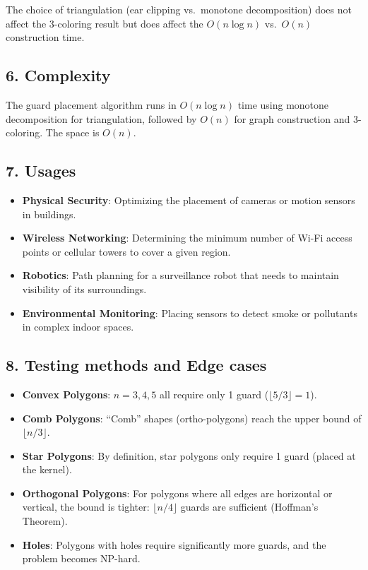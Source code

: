 \begin{definition}
\label{def:ag_triangulation_choice}
The choice of triangulation (ear clipping vs.\ monotone decomposition) does not affect the 3-coloring result but does affect the $O(n \log n)$ vs.\ $O(n)$ construction time.
\end{definition}

\subsection{6. Complexity}
\begin{theorem}
\label{thm:ag_complexity}
The guard placement algorithm runs in $O(n \log n)$ time using monotone decomposition for triangulation, followed by $O(n)$ for graph construction and 3-coloring. The space is $O(n)$.
\end{theorem}

\subsection{7. Usages}
\begin{itemize}
    \item \textbf{Physical Security}: Optimizing the placement of cameras or motion sensors in buildings.
    \item \textbf{Wireless Networking}: Determining the minimum number of Wi-Fi access points or cellular towers to cover a given region.
    \item \textbf{Robotics}: Path planning for a surveillance robot that needs to maintain visibility of its surroundings.
    \item \textbf{Environmental Monitoring}: Placing sensors to detect smoke or pollutants in complex indoor spaces.
\end{itemize}

\subsection{8. Testing methods and Edge cases}
\begin{itemize}
    \item \textbf{Convex Polygons}: $n=3, 4, 5$ all require only 1 guard ($\lfloor 5/3 \rfloor = 1$).
    \item \textbf{Comb Polygons}: ``Comb'' shapes (ortho-polygons) reach the upper bound of $\lfloor n/3 \rfloor$.
    \item \textbf{Star Polygons}: By definition, star polygons only require 1 guard (placed at the kernel).
    \item \textbf{Orthogonal Polygons}: For polygons where all edges are horizontal or vertical, the bound is tighter: $\lfloor n/4 \rfloor$ guards are sufficient (Hoffman's Theorem).
    \item \textbf{Holes}: Polygons with holes require significantly more guards, and the problem becomes NP-hard.
\end{itemize}

